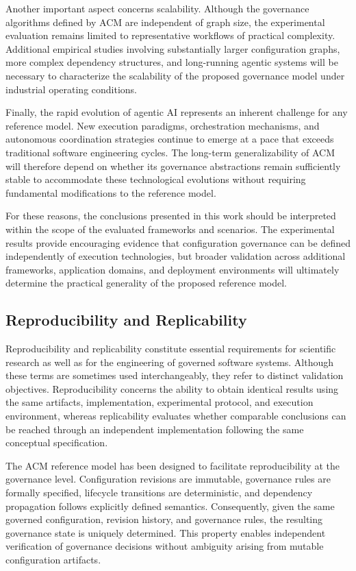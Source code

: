 \documentclass[10pt]{article}
\begin{document}
Another important aspect concerns scalability. Although the governance algorithms defined by ACM are independent of graph size, the experimental evaluation remains limited to representative workflows of practical complexity. Additional empirical studies involving substantially larger configuration graphs, more complex dependency structures, and long-running agentic systems will be necessary to characterize the scalability of the proposed governance model under industrial operating conditions.

Finally, the rapid evolution of agentic AI represents an inherent challenge for any reference model. New execution paradigms, orchestration mechanisms, and autonomous coordination strategies continue to emerge at a pace that exceeds traditional software engineering cycles. The long-term generalizability of ACM will therefore depend on whether its governance abstractions remain sufficiently stable to accommodate these technological evolutions without requiring fundamental modifications to the reference model.

For these reasons, the conclusions presented in this work should be interpreted within the scope of the evaluated frameworks and scenarios. The experimental results provide encouraging evidence that configuration governance can be defined independently of execution technologies, but broader validation across additional frameworks, application domains, and deployment environments will ultimately determine the practical generality of the proposed reference model.

\subsection{Reproducibility and Replicability}

Reproducibility and replicability constitute essential requirements for scientific research as well as for the engineering of governed software systems. Although these terms are sometimes used interchangeably, they refer to distinct validation objectives. Reproducibility concerns the ability to obtain identical results using the same artifacts, implementation, experimental protocol, and execution environment, whereas replicability evaluates whether comparable conclusions can be reached through an independent implementation following the same conceptual specification.

The ACM reference model has been designed to facilitate reproducibility at the governance level. Configuration revisions are immutable, governance rules are formally specified, lifecycle transitions are deterministic, and dependency propagation follows explicitly defined semantics. Consequently, given the same governed configuration, revision history, and governance rules, the resulting governance state is uniquely determined. This property enables independent verification of governance decisions without ambiguity arising from mutable configuration artifacts.
\end{document}
